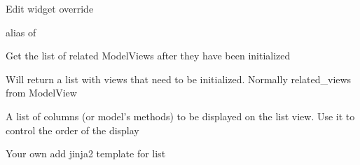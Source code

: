 \documentclass[letterpaper,10pt,english]{sphinxmanual}
\begin{document}
\begin{fulllineitems}
\begin{fulllineitems}
\end{fulllineitems}


\begin{fulllineitems}
\label{api:flask.ext.appbuilder.baseviews.BaseCRUDView.edit_widget}
Edit widget override

alias of 

\end{fulllineitems}


\begin{fulllineitems}
\label{api:flask.ext.appbuilder.baseviews.BaseCRUDView.get_init_inner_views}
Get the list of related ModelViews after they have been initialized

\end{fulllineitems}


\begin{fulllineitems}
\label{api:flask.ext.appbuilder.baseviews.BaseCRUDView.get_uninit_inner_views}
Will return a list with views that need to be initialized.
Normally related\_views from ModelView

\end{fulllineitems}


\begin{fulllineitems}
\label{api:flask.ext.appbuilder.baseviews.BaseCRUDView.list_columns}
A list of columns (or model's methods) to be displayed on the list view.
Use it to control the order of the display

\end{fulllineitems}


\begin{fulllineitems}
\label{api:flask.ext.appbuilder.baseviews.BaseCRUDView.list_template}
Your own add jinja2 template for list


\end{fulllineitems}
\end{fulllineitems}
\end{document}
